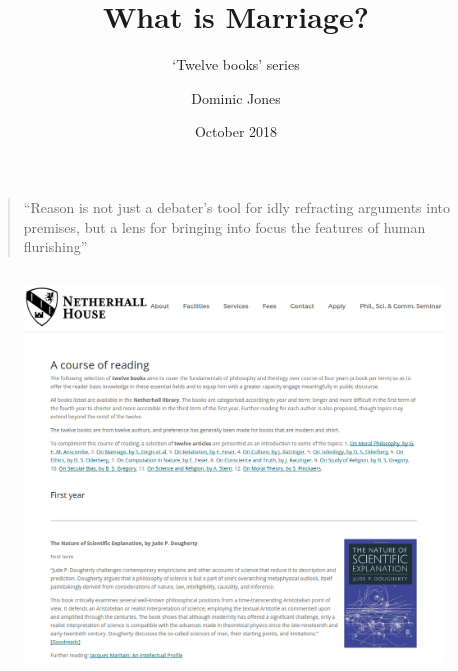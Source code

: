 \documentclass[xcolor=dvipsnames]{beamer}
\title{What is Marriage?}
\subtitle{`Twelve books' series}
\author{Dominic Jones}
\date{\small{October 2018}}
\institute{\small{\texttt{netherhallhouse.org.uk/books}}}
\begin{document}
\begin{frame}[plain]
  \titlepage
\end{frame}


\begin{frame}{}
  \begin{quote}
    ``Reason is not just a debater's tool for idly refracting arguments into premises, but a lens for bringing into focus the features of human flurishing''
  \end{quote}
\end{frame}


\begin{frame}[plain]
  \begin{columns}[T] %
    \begin{column}{0.9\textwidth}
      \begin{figure}[H]
        \centering
        \includegraphics[width=0.99\textwidth]{reading-group}
      \end{figure}
    \end{column}%
  \end{columns}
\end{frame}
\end{document}
